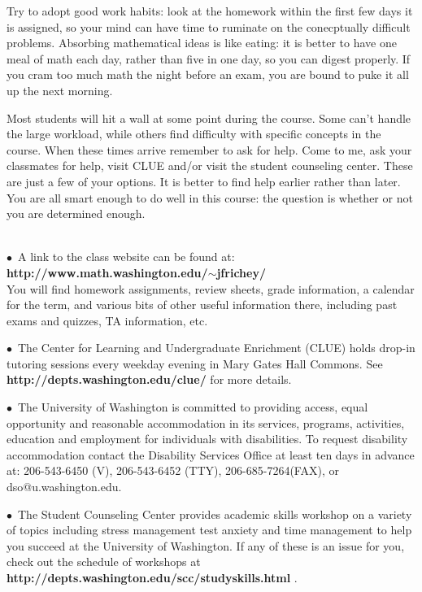 \documentclass[11 pt]{report}
\begin{document}
\noindent Try to adopt good work habits: look at
the homework within the first few days it is assigned, so your mind can have time to ruminate on the conecptually difficult problems.
Absorbing mathematical ideas is like eating: it is better to have one meal of math each day, rather than five in one day, so you can digest properly. If you cram too much math the night before an exam, you are bound to puke it all up the next morning.  

\vspace{.25cm}  

 Most students will hit a wall at some point
during the course.  Some can't handle the large workload, while
others find difficulty with specific concepts in the course. When
these times arrive remember to ask for help.  Come to me, ask your classmates for help, visit CLUE and/or visit the student counseling center.  These are just a
few of your options. It is better to find help earlier rather
than later. You are all smart enough to do well in this course: the
question is whether or not you are determined enough.
\vspace{0.3cm}

 \\
\noindent $\bullet$\ A link to the class website can be
found at: {\bf http://www.math.washington.edu/$\sim$jfrichey/} \\ You
will find homework assignments, review sheets, grade information, a
calendar for the term, and various bits of other useful information
there, including past exams and quizzes, TA information, etc.


\vspace{.2cm}

\noindent $\bullet$\ The Center for Learning and Undergraduate
Enrichment (CLUE) holds drop-in tutoring sessions every weekday
evening in Mary Gates Hall Commons.  See {\bf http://depts.washington.edu/clue/} for more details.

\vspace{.2cm}

\noindent $\bullet$\ The University of Washington is committed to providing
access, equal opportunity and reasonable accommodation in its
services, programs, activities, education and employment for
individuals with disabilities.  To request disability accommodation
contact the Disability Services Office at least ten days in advance
at: 206-543-6450 (V), 206-543-6452 (TTY), 206-685-7264(FAX), or
dso@u.washington.edu.

\vspace{.2cm}

\noindent $\bullet$\  The Student Counseling Center provides academic skills
workshop on a variety of topics including stress management test
anxiety and time management to help you succeed at the University of
Washington. If any of these is an issue for you, check out the
schedule of workshops at {\bf
http://depts.washington.edu/scc/studyskills.html} .
\end{document}
